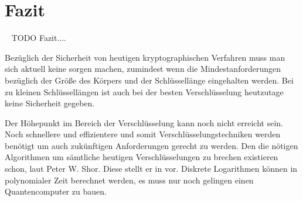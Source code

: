 \section*{Fazit}~\label{Kapitel Fazit}
	TODO Fazit....
	
	Bezüglich der Sicherheit von heutigen kryptographischen Verfahren muss man sich aktuell keine sorgen machen, zumindest wenn die Mindestanforderungen bezüglich der Größe des Körpers und der Schlüssellänge eingehalten werden. Bei zu kleinen Schlüssellängen ist auch bei der besten Verschlüsselung heutzutage keine Sicherheit gegeben.
	
	Der Höhepunkt im Bereich der Verschlüsselung kann noch nicht erreicht sein. Noch schnellere und effizientere und somit  Verschlüsselungstechniken werden benötigt um auch zukünftigen Anforderungen gerecht zu werden. Den die nötigen Algorithmen um sämtliche heutigen Verschlüsselungen zu brechen existieren schon, laut Peter W. Shor. Diese stellt er in \cite{Algorithms:for:Quantum:Computation:Discrete:Logarithms:and:Factoring} vor. Diskrete Logarithmen können in polynomialer Zeit berechnet werden, es muss nur noch gelingen einen Quantencomputer zu bauen.